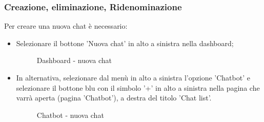 \documentclass[10pt, a4paper]{article}
\begin{document}
\subsubsection{Creazione, eliminazione, Ridenominazione}
Per creare una nuova chat è necessario:
\begin{itemize}
    \item Selezionare il bottone 'Nuova chat' in alto a sinistra nella dashboard;
    \begin{figure}[H]
        \centering  
        \caption{Dashboard - nuova chat}
    \end{figure}
    \item In alternativa, selezionare dal menù in alto a sinistra l'opzione 'Chatbot' e selezionare il bottone blu con il simbolo '+' in alto a sinistra nella pagina che varrà aperta (pagina 'Chatbot'), a destra del titolo 'Chat list'.
    \begin{figure}[H]
        \centering  
        \caption{Chatbot - nuova chat}
    \end{figure}
\end{itemize}
\end{document}

